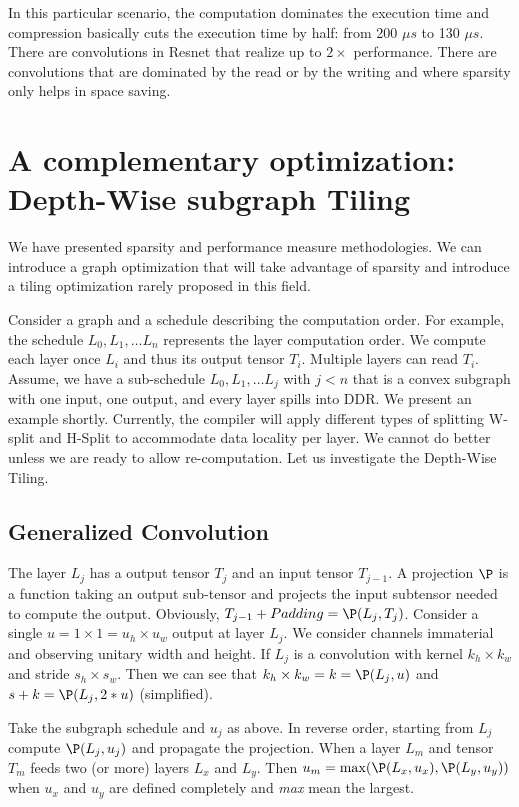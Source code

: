 \documentclass[conference]{IEEEtran}
\begin{document}
In this particular scenario, the computation dominates the execution
time and compression basically cuts the execution time by half: from
200 $\mu s$ to 130 $\mu s$. There are convolutions in Resnet that
realize up to $2\times$ performance. There are convolutions that are
dominated by the read or by the writing and where sparsity only helps
in space saving.



\section{A complementary optimization: Depth-Wise subgraph Tiling}
We have presented sparsity and performance measure methodologies. We
can introduce a graph optimization that will take advantage of
sparsity and introduce a tiling optimization rarely proposed in this
field.

Consider a graph and a schedule describing the computation order. For
example, the schedule $L_0, L_1, \dots L_n$ represents the layer
computation order. We compute each layer once $L_i$ and thus its
output tensor $T_i$. Multiple layers can read $T_i$. Assume, we have a
sub-schedule $L_0, L_1, \dots L_j$ with $j<n$ that is a convex
subgraph with one input, one output, and every layer spills into
DDR. We present an example shortly. Currently, the compiler will apply
different types of splitting W-split and H-Split to accommodate data
locality per layer.  We cannot do better unless we are ready to allow
re-computation. Let us investigate the Depth-Wise Tiling.

\subsection{Generalized Convolution} 
The layer $L_j$ has a output tensor $T_j$ and an input tensor
$T_{j-1}$. A projection $\P$ is a function taking an output sub-tensor
and projects the input subtensor needed to compute the
output. Obviously, $T_{j-1} + Padding = \P(L_j,T_j)$. Consider a
single $u = 1\times 1 = u_h \times u_w$ output at layer $L_j$. We
consider channels immaterial and observing unitary width and
height. If $L_j$ is a convolution with kernel $k_h\times k_w$ and
stride $s_h \times s_w$. Then we can see that $k_h\times k_w = k =
\P(L_j,u)$ and $s+k = \P(L_j,2*u)$ (simplified).

Take the subgraph schedule and $u_j$ as above. In reverse order,
starting from $L_j$ compute $\P(L_j,u_j)$ and propagate the
projection. When a layer $L_m$ and tensor $T_m$ feeds two (or more)
layers $L_x$ and $L_y$. Then $u_m = \max ( \P(L_x,u_x),\P(L_y,u_y))$
when $u_x$ and $u_y$ are defined completely and {\em max} mean the
largest.
\end{document}
